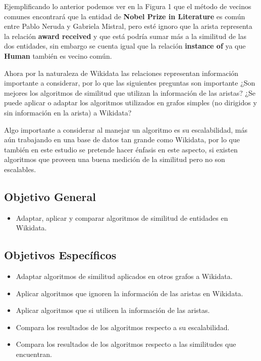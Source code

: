 Ejemplificando lo anterior podemos ver en la Figura 1  que el método de vecinos comunes encontrará que la entidad de \textbf{Nobel Prize in Literature} es común entre Pablo Neruda y Gabriela Mistral, pero esté ignoro que la arista representa la relación \textbf{award received}  y que está podría sumar más a la similitud de las dos entidades, sin embargo se cuenta igual que la relación \textbf{instance of} ya que \textbf{Human} también  es vecino común.

Ahora por la naturaleza de Wikidata las relaciones representan información importante a considerar, por lo que  las siguientes preguntas son importante  ¿Son mejores los algoritmos de similitud que utilizan la información de las aristas? ¿Se puede aplicar o adaptar los algoritmos utilizados en grafos simples (no dirigidos y sin información en la arista) a Wikidata?

Algo importante a considerar al manejar un algoritmo es su escalabilidad, más aún trabajando en una  base de datos tan grande como Wikidata, por lo que también en este estudio se pretende hacer énfasis en este aspecto, si existen algoritmos que proveen una buena medición de la similitud pero no son escalables.   

  
\subsection{Objetivo General}
\begin{itemize}
\item Adaptar, aplicar y comparar algoritmos  de similitud de entidades en Wikidata.   
\end{itemize}  

\subsection{Objetivos Específicos}
\begin{itemize}
\item Adaptar algoritmos de similitud aplicados en otros grafos  a  Wikidata.
\item Aplicar algoritmos que ignoren la información de las aristas en Wikidata. 
\item Aplicar algoritmos que si utilicen la información de las aristas. 
\item Compara los resultados de los algoritmos respecto a su escalabilidad. 
\item Compara los resultados de los algoritmos respecto a las similitudes que encuentran.
\end{itemize}
